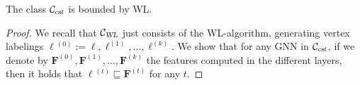 \begin{proposition}\label{prop:boundconstantR}
The class ${\cal C}_{\textsl{cst}}$  is bounded by WL.
\end{proposition}
\begin{proof}
We recall that ${\cal C}_{\textsl{WL}}$ just consists of the WL-algorithm, generating vertex labelings $\pmb{\ell}{}^{(0)}:=\pmb{\ell},\pmb{\ell}^{(1)},\ldots, \pmb{\ell}^{(k)}$. We show that for any GNN in 
${\cal C}_{\textsl{cst}}$, if we denote by
 $\mathbf{F}^{(0)},\mathbf{F}^{(1)},\ldots, \mathbf{F}^{(k)}$ the features
 computed in the different layers, then it holds that $\pmb{\ell}{}^{(t)}\sqsubseteq \mathbf{F}^{(t)}$ for any $t$. 


\end{proof}
